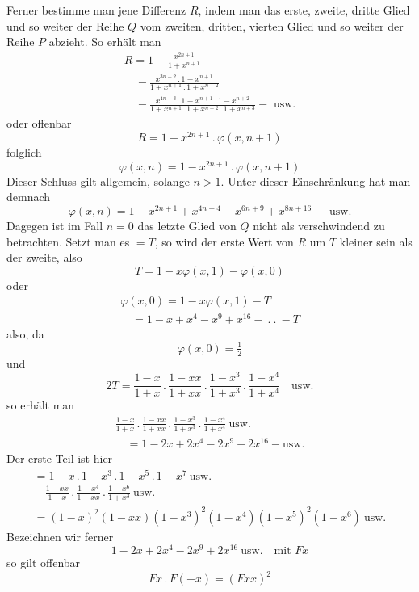 Ferner bestimme man jene Differenz $R$, indem man das erste, zweite, dritte
Glied und so weiter der Reihe $Q$ vom zweiten, dritten, vierten Glied und so weiter der Reihe
$P$ abzieht. So erhält man
\[
\begin{gathered}R=1-\frac{x^{2n+1}}{1+x^{n+1}}
\\[7pt]\quad{}-\frac{x^{3n+2}\mathbin{.}1-x^{n+1}}{1+x^{n+1}\mathbin{.}1+x^{n+2}}
\\[7pt]\quad{}-\frac{x^{4n+3}\mathbin{.}1-x^{n+1}\mathbin{.}1-x^{n+2}}{1+x^{n+1}\mathbin{.}1+x^{n+2}\mathbin{.}1+x^{n+3}}
-\text{ usw.}\end{gathered}
\]
oder offenbar
\[
R=1-x^{2n+1}\mathbin{.}\varphi(x,n+1)
\]
folglich
\[
\varphi(x,n)=1-x^{2n+1}\mathbin{.}\varphi(x,n+1)
\]
Dieser Schluss gilt allgemein, solange $n>1$. Unter dieser Einschränkung hat man demnach
\[
\varphi(x,n)=1-x^{2n+1}+x^{4n+4}-x^{6n+9}+x^{8n+16}-\text{ usw.}
\]
Dagegen ist im Fall $n=0$ das letzte Glied von $Q$ nicht als verschwindend zu betrachten. Setzt man es $=T$, so wird der erste Wert von $R$ um
$T$ kleiner sein als der zweite, also
\[
T=1-x\varphi(x,1)-\varphi(x,0)
\]
oder
\[
\begin{gathered}\varphi(x,0)=1-x\varphi(x,1)-T\\[7pt]\quad{}=1-x+x^4-x^9+x^{16}-\ .\ .\ -T\end{gathered}
\]
also, da
\[
\varphi(x,0)=\tfrac12
\]
und
\[
2T=\frac{1-x}{1+x}\mathbin{.}\frac{1-xx}{1+xx}\mathbin{.}\frac{1-x^3}{1+x^3}\mathbin{.}\frac{1-x^4}{1+x^4}\quad\text{usw.}
\]
so erhält man
\[
\begin{gathered}\frac{1-x}{1+x}\,.\,\frac{1-xx}{1+xx}\,.\,\frac{1-x^3}{1+x^3}\,.\,\frac{1-x^4}{1+x^4}\ \text{usw.}
\\[7pt]\quad{}=1-2x+2x^4-2x^9+2x^{16}-\text{usw.}\end{gathered}
\]
Der erste Teil ist hier
\[
\begin{gathered}
=1-x\,.\,1-x^3\,.\,1-x^5\,.\,1-x^7\ \text{usw.}\quad
\\[7pt]\quad{}\frac{1-xx}{1+x}\,.\,\frac{1-x^4}{1+xx}\,.\,\frac{1-x^6}{1+x^3}\ \text{usw.}\\[7pt]
=(1-x)^2(1-xx)(1-x^3)^2(1-x^4)(1-x^5)^2(1-x^6)\ \text{usw.}
\end{gathered}
\]
Bezeichnen wir ferner
\[
1-2x+2x^4-2x^9+2x^{16}\ \text{usw.}\quad\text{mit }Fx
\]
so gilt offenbar
\[
Fx\,.\,F(-x)=(Fxx)^2
\]
\clearpage
\endgroup
